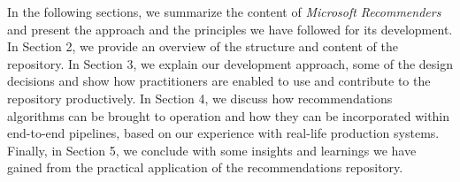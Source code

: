 In the following sections, we summarize the content of {\em Microsoft Recommenders} and present the approach and the principles we have followed
for its development. In Section 2, we provide an overview of the structure and content of the repository. In Section 3, we explain our development approach, some of
the design decisions and show how practitioners are enabled to use and contribute to the repository productively. In Section 4, we discuss how recommendations
algorithms can be brought to operation and how they can be incorporated within end-to-end pipelines, based on our experience with real-life production systems. 
Finally, in Section 5, we conclude with some insights and learnings we have gained from the practical application of the recommendations repository.

